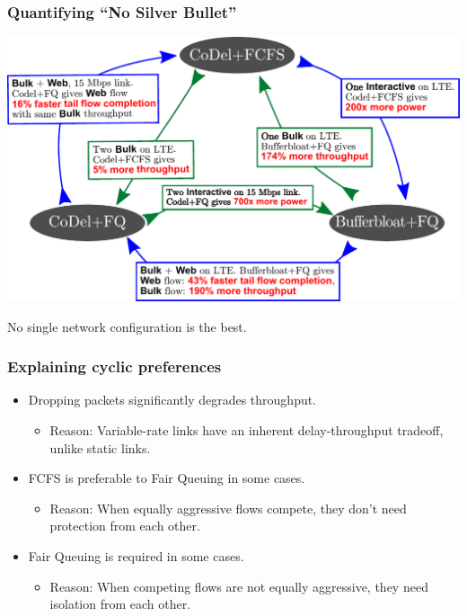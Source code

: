 \begin{frame}[plain]
\frametitle{Quantifying ``No Silver Bullet''}
\begin{center}
\includegraphics[width=\columnwidth]{fig.pdf}
\end{center}
\end{frame}

\begin{frame}[plain]
\begin{center}
\LARGE No single network configuration is the best.
\end{center}
\end{frame}

\begin{frame}[plain]
\frametitle{Explaining cyclic preferences}
\begin{itemize}
\item Dropping packets significantly degrades throughput.
      \begin{itemize}
      \item Reason: Variable-rate links have an inherent delay-throughput tradeoff, unlike static links.
      \end{itemize} 
 
\item FCFS is preferable to Fair Queuing in some cases.
      \begin{itemize}
      \item Reason: When equally aggressive flows compete, they don't need protection from each other.
      \end{itemize}

\item Fair Queuing is required in some cases.
      \begin{itemize}      
      \item Reason: When competing flows are not equally aggressive, they need isolation from each other.
      \end{itemize}
\end{itemize}
\end{frame}

